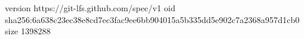 version https://git-lfs.github.com/spec/v1
oid sha256:6a638c23ec38e8cd7ec3fac9ee6bb904015a5b335dd5e902c7a2368a957d1cb0
size 1398288
